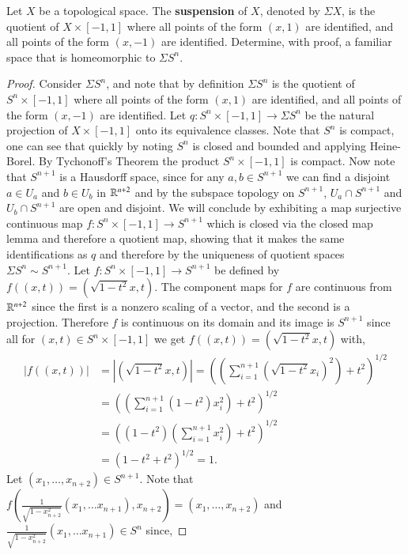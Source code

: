 \documentclass{homework651}
\begin{document}
\begin{problems}
\problem Let $X$ be a topological space.  The {\bf suspension} of $X$, denoted by
$\Sigma X$, is the quotient of $X\times [-1,1]$ where all points of the form $(x,1)$
are identified, and all points of the form $(x,-1)$ are identified.  
Determine, with proof, a familiar space that is homeomorphic to $\Sigma S^n$.
\begin{proof}Consider $\Sigma S^n$, and note that by definition $\Sigma S^n$ is the quotient of $S^n\times [-1,1]$ where all points of the form $(x,1)$ are identified, and all points of the form $(x,-1)$ are identified. Let $q:S^n\times [-1,1] \to \Sigma S^n$ be the natural projection of $X\times [-1,1]$ onto its equivalence classes. Note that $S^n$ is compact, one can see that quickly by noting $S^n$ is closed and bounded and applying Heine-Borel. By Tychonoff's Theorem the product $S^n\times [-1,1]$ is compact. Now note that $S^{n+1}$ is a Hausdorff space, since for any $a, b\in S^{n+1}$ we can find a disjoint $a \in U_a$ and $b \in U_b$ in $\RR^{n+2}$ and by the subspace topology on $S^{n+1}$, $U_a\cap S^{n+1}$ and $U_b\cap S^{n+1}$ are open and disjoint. We will conclude by exhibiting a map surjective continuous map $f:S^n\times [-1,1] \to S^{n+1}$ which is closed via the closed map lemma and therefore a quotient map, showing that it makes the same identifications as $q$ and therefore by the uniqueness of quotient spaces $\Sigma S^n \sim S^{n+1}$.
    Let $f:S^n\times [-1,1] \to S^{n+1}$ be defined by $f((x, t)) = (\sqrt{1 - t^2}x, t)$. The component maps for $f$ are continuous from $\RR^{n+2}$ since the first is a nonzero scaling of a vector, and the second is a projection. Therefore $f$ is continuous on its domain and its image is $S^{n+1}$ since all for $(x, t) \in S^n\times [-1,1]$ we get $f((x, t)) = (\sqrt{1 - t^2}x, t)$ with,
    \begin{align*}
    |f((x, t))| &= |(\sqrt{1 - t^2}x, t)| = \left(\left(\sum_{i = 1}^{n+1} (\sqrt{1 - t^2}x_i)^2\right)  + t^2\right)^{1/2}\\ 
    &=  \left(\left(\sum_{i = 1}^{n+1} (1 - t^2)x_i^2\right)  + t^2\right)^{1/2}\\   
    &= \left((1 - t^2)\left(\sum_{i = 1}^{n+1}x_i^2\right)  + t^2\right)^{1/2}\\  
    &= \left(1 - t^2 + t^2\right)^{1/2} = 1.
    \end{align*}
    Let $(x_1, \dots, x_{n+2}) \in S^{n+1}$. Note that $f\left(\frac{1}{\sqrt{1 - x_{n+2}^2}}(x_1, \dots x_{n+1}), x_{n+2}\right) = (x_1, \dots, x_{n+2})$ and $\frac{1}{\sqrt{1 - x_{n+2}^2}}(x_1, \dots x_{n+1}) \in S^{n}$ since, 

\end{proof}
\end{problems}
\end{document}
